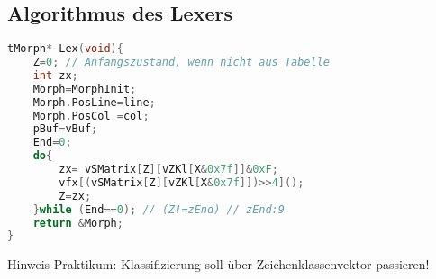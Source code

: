 \subsection{Algorithmus des Lexers}
\begin{lstlisting}[language=C]
tMorph* Lex(void){
	Z=0; // Anfangszustand, wenn nicht aus Tabelle
	int zx;
	Morph=MorphInit;
	Morph.PosLine=line;
	Morph.PosCol =col;
	pBuf=vBuf;
	End=0;
	do{
		zx= vSMatrix[Z][vZKl[X&0x7f]]&0xF;
		vfx[(vSMatrix[Z][vZKl[X&0x7f]])>>4]();
		Z=zx;
	}while (End==0); // (Z!=zEnd) // zEnd:9
	return &Morph;
}
\end{lstlisting}

Hinweis Praktikum: Klassifizierung soll über Zeichenklassenvektor passieren!








